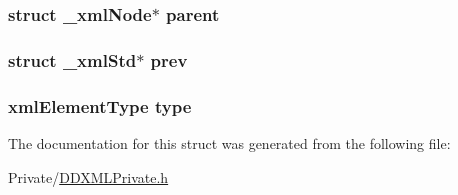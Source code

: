 \label{struct__xml_std_af14a9735a8fc3d702c0e5c7b4a23c807}
\hypertarget{struct__xml_std_a6e3b197c773ec09059c77c324278ea78}{
\subsubsection[{parent}]{\setlength{\rightskip}{0pt plus 5cm}struct \_\-xmlNode$\ast$ {\bf parent}}}
\label{struct__xml_std_a6e3b197c773ec09059c77c324278ea78}
\hypertarget{struct__xml_std_ade08dff7cd7076604af40f70522ffaee}{
\subsubsection[{prev}]{\setlength{\rightskip}{0pt plus 5cm}struct {\bf \_\-xmlStd}$\ast$ {\bf prev}}}
\label{struct__xml_std_ade08dff7cd7076604af40f70522ffaee}
\hypertarget{struct__xml_std_ac5b2f541d66059a7c8de2599ba543e70}{
\subsubsection[{type}]{\setlength{\rightskip}{0pt plus 5cm}xmlElementType {\bf type}}}
\label{struct__xml_std_ac5b2f541d66059a7c8de2599ba543e70}


The documentation for this struct was generated from the following file:\begin{DoxyCompactItemize}
\item 
Private/\hyperlink{_d_d_x_m_l_private_8h}{DDXMLPrivate.h}\end{DoxyCompactItemize}
